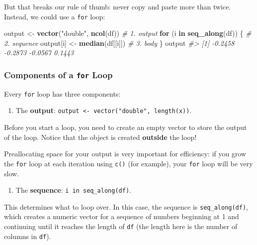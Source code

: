 \documentclass[]{book}
\newenvironment{Shaded}{\begin{snugshade}}{\end{snugshade}}
\newcommand{\CommentTok}[1]{\textcolor[rgb]{0.56,0.35,0.01}{\textit{#1}}}
\newcommand{\ControlFlowTok}[1]{\textcolor[rgb]{0.13,0.29,0.53}{\textbf{#1}}}
\newcommand{\KeywordTok}[1]{\textcolor[rgb]{0.13,0.29,0.53}{\textbf{#1}}}
\newcommand{\NormalTok}[1]{#1}
\newcommand{\StringTok}[1]{\textcolor[rgb]{0.31,0.60,0.02}{#1}}
\providecommand{\tightlist}{%
  \setlength{\itemsep}{0pt}\setlength{\parskip}{0pt}}
\begin{document}
But that breaks our rule of thumb: never copy and paste more than twice. Instead, we could use a \texttt{for} loop:

\begin{Shaded}
\begin{Highlighting}[]
\NormalTok{output <-}\StringTok{ }\KeywordTok{vector}\NormalTok{(}\StringTok{"double"}\NormalTok{, }\KeywordTok{ncol}\NormalTok{(df))  }\CommentTok{# 1. output}
\ControlFlowTok{for}\NormalTok{ (i }\ControlFlowTok{in} \KeywordTok{seq_along}\NormalTok{(df)) \{            }\CommentTok{# 2. sequence}
\NormalTok{  output[i] <-}\StringTok{ }\KeywordTok{median}\NormalTok{(df[[i]])        }\CommentTok{# 3. body}
\NormalTok{\}}
\NormalTok{output}
\CommentTok{#> [1] -0.2458 -0.2873 -0.0567  0.1443}
\end{Highlighting}
\end{Shaded}

\hypertarget{components-of-a-for-loop}{%
\subsubsection*{\texorpdfstring{Components of a \texttt{for} Loop}{Components of a for Loop}}\label{components-of-a-for-loop}}

Every \texttt{for} loop has three components:

\begin{enumerate}
\def\labelenumi{\arabic{enumi}.}
\tightlist
\item
  The \textbf{output}: \texttt{output\ \textless{}-\ vector("double",\ length(x))}.
\end{enumerate}

Before you start a loop, you need to create an empty vector to store the output of the loop. Notice that the object is created \textbf{outside} the loop!

Preallocating space for your output is very important for efficiency: if you grow the \texttt{for} loop at each iteration using \texttt{c()} (for example), your \texttt{for} loop will be very slow.

\begin{enumerate}
\def\labelenumi{\arabic{enumi}.}
\setcounter{enumi}{1}
\tightlist
\item
  The \textbf{sequence}: \texttt{i\ in\ seq\_along(df)}.
\end{enumerate}

This determines what to loop over. In this case, the sequence is \texttt{seq\_along(df)}, which creates a numeric vector for a sequence of numbers beginning at 1 and continuing until it reaches the length of \texttt{df} (the length here is the number of columns in \texttt{df}).
\end{document}

